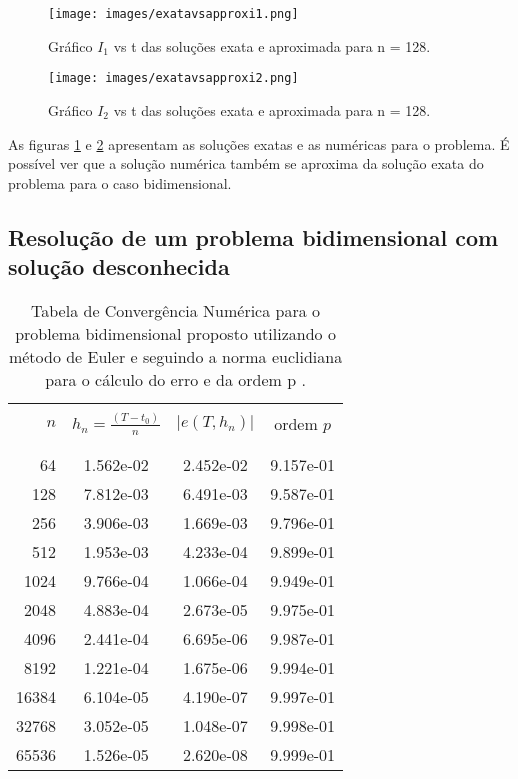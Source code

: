 \documentclass[12pt]{article}
\begin{document}
     \begin{figure}
       \texttt{[image: images/exatavsapproxi1.png]}
       \caption{Gráfico \(I_1\) vs t das soluções exata e aproximada para n = 128.}
       \label{exactvsapprox2.2i1}
    \end{figure}

    \begin{figure}
       \texttt{[image: images/exatavsapproxi2.png]}
       \caption{Gráfico \(I_2\) vs t das soluções exata e aproximada para n = 128.}
       \label{exactvsapprox2.2i2}
    \end{figure}

    As figuras \ref{exactvsapprox2.2i1} e \ref{exactvsapprox2.2i2} apresentam as soluções exatas e as numéricas para o problema. É possível ver que a solução numérica também se aproxima da solução exata do problema para o caso bidimensional.
 
       \subsection{Resolução de um problema bidimensional com solução desconhecida}

           \begin{table}[!ht]
    \centering
    \begin{tabular}{rccc}
    \hline\hline\\
          $n$ & $h_n=\displaystyle \frac{(T-t_0)}{n}$ 
              & $\left|e(T, h_n)\right|$  & ordem $p$\\\\
   \hline\hline\\

   64 & 1.562e-02 & 2.452e-02 & 9.157e-01 \\
  128 & 7.812e-03 & 6.491e-03 & 9.587e-01 \\
  256 & 3.906e-03 & 1.669e-03 & 9.796e-01 \\
  512 & 1.953e-03 & 4.233e-04 & 9.899e-01 \\
 1024 & 9.766e-04 & 1.066e-04 & 9.949e-01 \\
 2048 & 4.883e-04 & 2.673e-05 & 9.975e-01 \\
 4096 & 2.441e-04 & 6.695e-06 & 9.987e-01 \\
 8192 & 1.221e-04 & 1.675e-06 & 9.994e-01 \\
16384 & 6.104e-05 & 4.190e-07 & 9.997e-01 \\
32768 & 3.052e-05 & 1.048e-07 & 9.998e-01 \\
65536 & 1.526e-05 & 2.620e-08 & 9.999e-01 \\

   
   \hline\hline 
   \end{tabular}
   
   \caption{Tabela de Convergência Numérica para o problema bidimensional proposto utilizando o método de Euler e seguindo a norma euclidiana para o cálculo do erro e da ordem p .}
   \label{tabela3}
\end{table}
\end{document}
